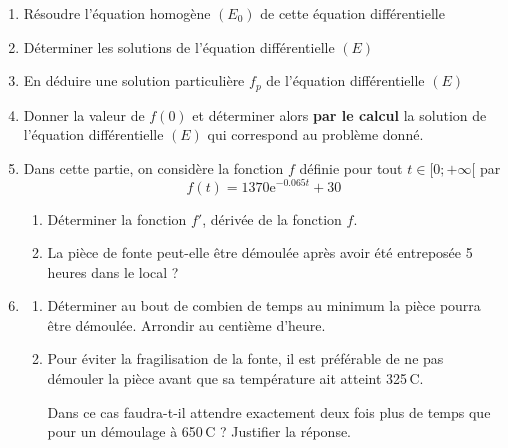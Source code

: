 \documentclass[a4paper,12pt]{article}
\newcommand{\e}{\mathrm {e}}
\begin{document}
\begin{enumerate}
\item Résoudre l'équation homogène $(E_0)$ de cette équation différentielle

\vspace{2cm}

\item Déterminer les solutions de  l'équation différentielle $(E)$

\vspace{2cm}

\item En déduire une solution particulière $f_p$ de l'équation différentielle $(E)$

\vspace{2cm}

\item Donner la valeur de $f(0)$ et déterminer alors \textbf{par le calcul} la solution de l'équation différentielle $(E)$ qui correspond au problème donné.

\vspace{3cm}

\newpage

\item Dans cette partie, on considère la fonction $f$ définie pour tout $t \in [0;+\infty[$ par $$f(t)=1370 \e^{-0.065t}+30$$

\begin{enumerate}

\item Déterminer la fonction $f'$, dérivée de la fonction $f$.
	
	\vspace{2cm}
	
\item La pièce de fonte peut-elle être démoulée après avoir été entreposée 5 heures dans le local ?
	
\vspace{3cm}
	
	\bigskip
\end{enumerate}
	

\item
  \begin{enumerate}
  \item Déterminer au bout de combien de temps au minimum la pièce pourra être démoulée. Arrondir au centième d'heure.
  
  \vspace{3cm}
  
  
  \item Pour éviter la fragilisation de la fonte, il est préférable de ne pas démouler la pièce avant que sa température ait atteint 325\,\degres C.

    Dans ce cas faudra-t-il attendre exactement deux fois plus de temps que pour un démoulage à 650\,\degres C ? Justifier la réponse.

  \end{enumerate}
  
  \end{enumerate}
\end{document}
